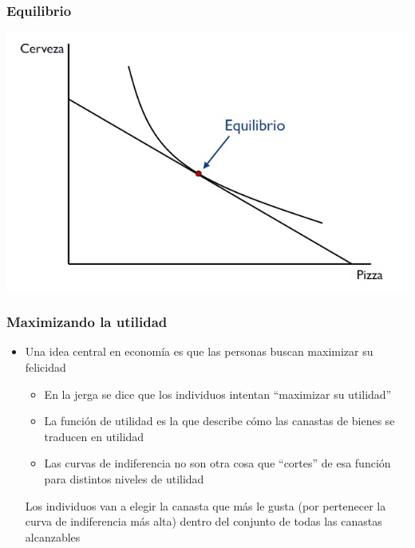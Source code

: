 \documentclass{beamer}
\begin{document}
\begin{frame}
\frametitle{Equilibrio}
\centering
\includegraphics[scale=0.65]{../Figures/Tema_02.19_rp17.jpg}
\end{frame}

\begin{frame}
\frametitle{Maximizando la utilidad}
\begin{itemize}
    \item Una idea central en economía es que las personas buscan maximizar su felicidad
    \begin{itemize}
    \item En la jerga se dice que los individuos intentan ``maximizar su utilidad''
    \item La función de utilidad es la que describe cómo las canastas de bienes se traducen en utilidad
    \item Las curvas de indiferencia no son otra cosa que ``cortes'' de esa función para distintos niveles de utilidad
    \end{itemize}
    \begin{boxA}
        \begin{center}
        Los individuos van a elegir la canasta que más le gusta (por pertenecer la curva de indiferencia más alta) dentro del conjunto de todas las canastas alcanzables
        \end{center}
    \end{boxA}
\end{itemize} 
\end{frame}
\end{document}

